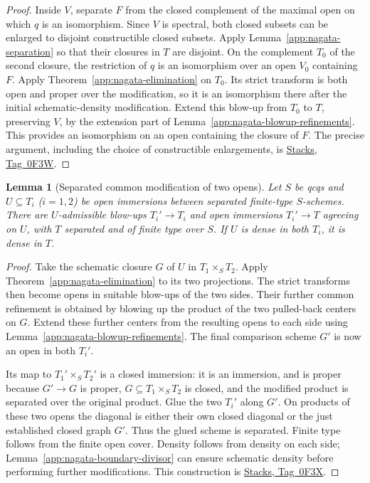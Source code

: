 \documentclass[11pt,a4paper]{article}
\numberwithin{equation}{section}
\newtheorem{lemma}[theorem]{Lemma}
\theoremstyle{definition}
\theoremstyle{remark}
\newcommand{\stacks}[1]{\href{https://stacks.math.columbia.edu/tag/#1}{\textnormal{Stacks, Tag~#1}}}
\begin{document}
\begin{proof}
Inside $V$, separate $F$ from the closed complement of the maximal
open on which $q$ is an isomorphism. Since $V$ is spectral, both
closed subsets can be enlarged to disjoint constructible closed
subsets. Apply Lemma~\ref{app:nagata-separation} so that their closures
in $T$ are disjoint. On the complement $T_0$ of the second closure,
the restriction of $q$ is an isomorphism over an open $V_0$ containing
$F$. Apply Theorem~\ref{app:nagata-elimination} on $T_0$. Its strict
transform is both open and proper over the modification, so it is
an isomorphism there after the initial schematic-density modification.
Extend this blow-up from $T_0$ to $T$, preserving $V$, by the
extension part of Lemma~\ref{app:nagata-blowup-refinements}. This provides an isomorphism on
an open containing the closure of $F$. The precise argument, including
the choice of constructible enlargements, is \stacks{0F3W}.
\end{proof}

\begin{lemma}[Separated common modification of two opens]
\label{app:nagata-common-modification}
Let $S$ be qcqs and $U\subseteq T_i$ ($i=1,2$) be open immersions
between separated finite-type $S$-schemes. There are $U$-admissible
blow-ups $T_i'\to T_i$ and open immersions $T_i'\to T$ agreeing
on $U$, with $T$ separated and of finite type over $S$.
If $U$ is dense in both $T_i$, it is dense in $T$.
\end{lemma}

\begin{proof}
Take the schematic closure $G$ of $U$ in $T_1\times_ST_2$.
Apply Theorem~\ref{app:nagata-elimination} to its two projections.
The strict transforms then become opens in suitable blow-ups of
the two sides. Their further common refinement is obtained by
blowing up the product of the two pulled-back centers on $G$.
Extend these further centers from the resulting opens to each side
using Lemma~\ref{app:nagata-blowup-refinements}. The final comparison
scheme $G'$ is now an open in both $T_i'$.

Its map to $T_1'\times_ST_2'$ is a closed immersion: it is an
immersion, and is proper because $G'\to G$ is proper,
$G\subseteq T_1\times_ST_2$ is closed, and the modified product
is separated over the original product. Glue the two $T_i'$ along
$G'$. On products of these two opens the diagonal is either their
own closed diagonal or the just established closed graph $G'$.
Thus the glued scheme is separated. Finite type follows from the
finite open cover. Density follows from density on each side;
Lemma~\ref{app:nagata-boundary-divisor} can ensure schematic density
before performing further modifications. This construction is
\stacks{0F3X}.
\end{proof}
\end{document}
